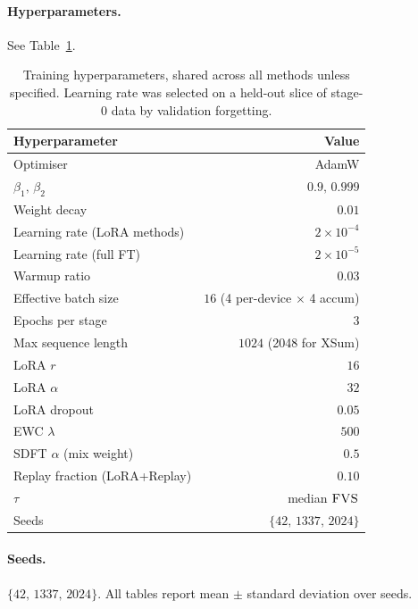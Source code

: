 \paragraph{Hyperparameters.} See Table~\ref{tab:hparams}.
\begin{table}[h]
  \centering
  \small
  \begin{tabular}{lr}
    \toprule
    Hyperparameter & Value \\
    \midrule
    Optimiser                        & AdamW \\
    $\beta_1,\,\beta_2$              & $0.9,\,0.999$ \\
    Weight decay                     & $0.01$ \\
    Learning rate (LoRA methods)     & $2\!\times\!10^{-4}$ \\
    Learning rate (full FT)          & $2\!\times\!10^{-5}$ \\
    Warmup ratio                     & $0.03$ \\
    Effective batch size             & $16$ (4 per-device $\times$ 4 accum) \\
    Epochs per stage                 & $3$ \\
    Max sequence length              & $1024$ (2048 for XSum) \\
    LoRA $r$                         & $16$ \\
    LoRA $\alpha$                    & $32$ \\
    LoRA dropout                     & $0.05$ \\
    EWC $\lambda$                    & $500$ \\
    SDFT $\alpha$ (mix weight)       & $0.5$ \\
    Replay fraction (LoRA+Replay)    & $0.10$ \\
    \tglora{} $\tau$                 & median $\textsc{FVS}$ \\
    Seeds                            & $\{42,\,1337,\,2024\}$ \\
    \bottomrule
  \end{tabular}
  \caption{Training hyperparameters, shared across all methods unless specified. Learning rate was selected on a held-out slice of stage-0 data by validation forgetting.}
  \label{tab:hparams}
\end{table}

\paragraph{Seeds.} $\{42,\,1337,\,2024\}$. All tables report mean $\pm$ standard deviation over seeds.

